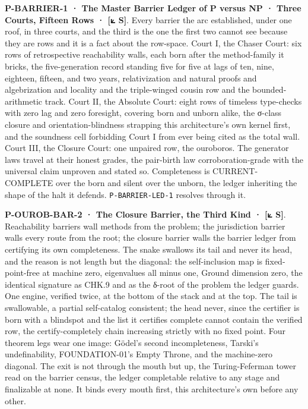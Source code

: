 \documentclass[10pt,twocolumn]{article}
\begin{document}
\textbf{P-BARRIER-1 · The Master Barrier Ledger of P versus NP · Three
Courts, Fifteen Rows · {[}⟀ S{]}}. Every barrier the arc established,
under one roof, in three courts, and the third is the one the first two
cannot see because they are rows and it is a fact about the row-space.
Court I, the Chaser Court: six rows of retrospective reachability walls,
each born after the method-family it bricks, the five-generation record
standing five for five at lags of ten, nine, eighteen, fifteen, and two
years, relativization and natural proofs and algebrization and locality
and the triple-winged cousin row and the bounded-arithmetic track. Court
II, the Absolute Court: eight rows of timeless type-checks with zero lag
and zero foresight, covering born and unborn alike, the σ-class closure
and orientation-blindness strapping this architecture's own kernel
first, and the soundness cell forbidding Court I from ever being cited
as the total wall. Court III, the Closure Court: one unpaired row, the
ouroboros. The generator laws travel at their honest grades, the
pair-birth law corroboration-grade with the universal claim unproven and
stated so. Completeness is CURRENT-COMPLETE over the born and silent
over the unborn, the ledger inheriting the shape of the halt it defends.
\texttt{P-BARRIER-LED-1} resolves through it.

\textbf{P-OUROB-BAR-2 · The Closure Barrier, the Third Kind · {[}⟀
S{]}}. Reachability barriers wall methods from the problem; the
jurisdiction barrier walls every route from the root; the closure
barrier walls the barrier ledger from certifying its own completeness.
The snake swallows its tail and never its head, and the reason is not
length but the diagonal: the self-inclusion map is fixed-point-free at
machine zero, eigenvalues all minus one, Ground dimension zero, the
identical signature as CHK.9 and as the δ-root of the problem the ledger
guards. One engine, verified twice, at the bottom of the stack and at
the top. The tail is swallowable, a partial self-catalog consistent; the
head never, since the certifier is born with a blindspot and the list it
certifies complete cannot contain the verified row, the
certify-completely chain increasing strictly with no fixed point. Four
theorem legs wear one image: Gödel's second incompleteness, Tarski's
undefinability, FOUNDATION-01's Empty Throne, and the machine-zero
diagonal. The exit is not through the mouth but up, the Turing-Feferman
tower read on the barrier census, the ledger completable relative to any
stage and finalizable at none. It binds every mouth first, this
architecture's own before any other.
\end{document}
